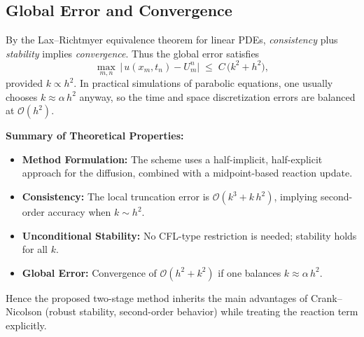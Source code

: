 \subsection{Global Error and Convergence}

By the Lax–Richtmyer equivalence theorem for linear PDEs, \emph{consistency} plus
\emph{stability} implies \emph{convergence}. Thus the global error satisfies
\[
  \max_{m,n}\,\bigl|\,u(x_m,t_n) - U_m^n\bigr|
  \;\le\;
  C\,\bigl(k^2 + h^2\bigr),
\]
provided \(k \propto h^2\). In practical simulations of parabolic equations, one usually
chooses \(k \approx \alpha \,h^2\) anyway, so the time and space discretization errors
are balanced at \(\mathcal{O}(h^2)\).

\medskip
\noindent
\textbf{Summary of Theoretical Properties:}
\begin{itemize}
    \item \textbf{Method Formulation:} The scheme uses a half-implicit, half-explicit approach
          for the diffusion, combined with a midpoint-based reaction update.
    \item \textbf{Consistency:} The local truncation error is \(\mathcal{O}(k^3 + k\,h^2)\),
          implying second-order accuracy when \(k \sim h^2\).
    \item \textbf{Unconditional Stability:} No CFL-type restriction is needed; stability
          holds for all \(k\).
    \item \textbf{Global Error:} Convergence of \(\mathcal{O}(h^2 + k^2)\) if one balances
          \(k \approx \alpha\,h^2\).
\end{itemize}

Hence the proposed two-stage method inherits the main advantages of Crank–Nicolson
(robust stability, second-order behavior) while treating the reaction term explicitly.
